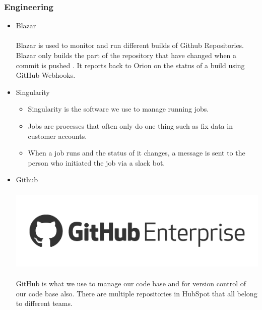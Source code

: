 \documentclass[12pt]{article} %
\begin{document}
\subsubsection{\textbf{Engineering}}
\begin{itemize}
\item Blazar\\\\
Blazar is used to monitor and run different builds of Github Repositories. Blazar only builds the part of the repository that have changed when a commit is pushed . It reports back to Orion on the status of a build using GitHub Webhooks.
\item Singularity
\begin{itemize}
\item Singularity is the software we use to manage running jobs. 
\item Jobs are processes that often only do one thing such as fix data in customer accounts.
\item When a job runs and the status of it changes,  a message is sent to the person who initiated the job via a slack bot. 
\end{itemize}
\item Github \\\\
\includegraphics[scale=0.2]{github.png}\\\\
GitHub is what we use to manage our code base and for version control of our code base also.  There are multiple repositories in HubSpot that all belong to different teams. 
\end{itemize}
\end{document}
